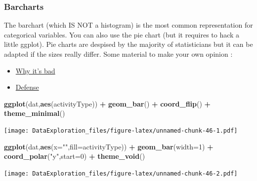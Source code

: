 \documentclass[
]{book}
\newenvironment{Shaded}{\begin{snugshade}}{\end{snugshade}}
\newcommand{\DataTypeTok}[1]{\textcolor[rgb]{0.13,0.29,0.53}{#1}}
\newcommand{\DecValTok}[1]{\textcolor[rgb]{0.00,0.00,0.81}{#1}}
\newcommand{\KeywordTok}[1]{\textcolor[rgb]{0.13,0.29,0.53}{\textbf{#1}}}
\newcommand{\NormalTok}[1]{#1}
\newcommand{\OperatorTok}[1]{\textcolor[rgb]{0.81,0.36,0.00}{\textbf{#1}}}
\newcommand{\StringTok}[1]{\textcolor[rgb]{0.31,0.60,0.02}{#1}}
\providecommand{\tightlist}{%
  \setlength{\itemsep}{0pt}\setlength{\parskip}{0pt}}
\begin{document}
\hypertarget{barcharts}{%
\subsubsection{Barcharts}\label{barcharts}}

The barchart (which IS NOT a histogram) is the most common representation for categorical variables. You can also use the pie chart (but it requires to hack a little ggplot).
Pie charts are despised by the majority of statisticians but it can be adapted if the sizes really differ. Some material to make your own opinion :

\begin{itemize}
\tightlist
\item
  \href{https://www.data-to-viz.com/caveat/pie.html}{Why it's bad}
\item
  \href{https://www.oreilly.com/content/in-defense-of-the-pie-chart/}{Defense}
\end{itemize}

\begin{Shaded}
\begin{Highlighting}[]
\KeywordTok{ggplot}\NormalTok{(dat,}\KeywordTok{aes}\NormalTok{(activityType)) }\OperatorTok{+}\StringTok{ }\KeywordTok{geom_bar}\NormalTok{() }\OperatorTok{+}\StringTok{ }\KeywordTok{coord_flip}\NormalTok{() }\OperatorTok{+}\StringTok{ }\KeywordTok{theme_minimal}\NormalTok{()}
\end{Highlighting}
\end{Shaded}

\texttt{[image: DataExploration\_files/figure-latex/unnamed-chunk-46-1.pdf]}

\begin{Shaded}
\begin{Highlighting}[]
\KeywordTok{ggplot}\NormalTok{(dat,}\KeywordTok{aes}\NormalTok{(}\DataTypeTok{x=}\StringTok{""}\NormalTok{,}\DataTypeTok{fill=}\NormalTok{activityType)) }\OperatorTok{+}\StringTok{ }
\StringTok{  }\KeywordTok{geom_bar}\NormalTok{(}\DataTypeTok{width=}\DecValTok{1}\NormalTok{) }\OperatorTok{+}\StringTok{ }
\StringTok{  }\KeywordTok{coord_polar}\NormalTok{(}\StringTok{"y"}\NormalTok{,}\DataTypeTok{start=}\DecValTok{0}\NormalTok{) }\OperatorTok{+}\StringTok{ }
\StringTok{  }\KeywordTok{theme_void}\NormalTok{()}
\end{Highlighting}
\end{Shaded}

\texttt{[image: DataExploration\_files/figure-latex/unnamed-chunk-46-2.pdf]}
\end{document}
